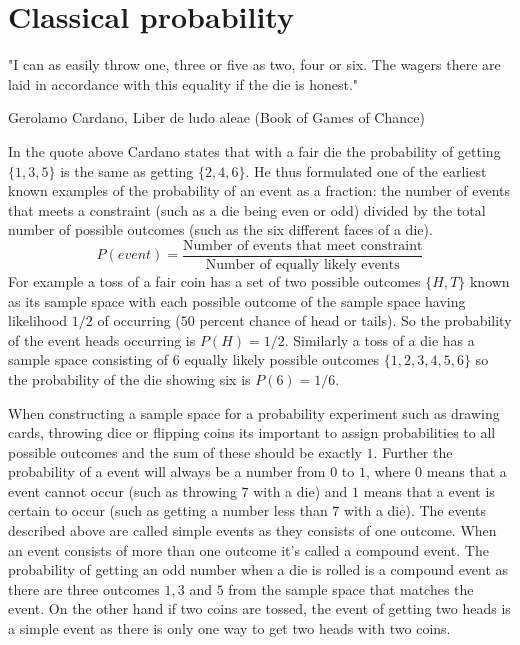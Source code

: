 \section{Classical probability}
\epigraph{"I can as easily throw one, three or five as two, four or six. The wagers there are laid in accordance with this equality if the die is honest."}{\textup{Gerolamo Cardano}, Liber de ludo aleae (Book of Games of Chance)}

In the quote above Cardano states that with a fair die the probability of getting $\{1,3,5\}$ is the same as getting $\{2,4,6\}$. He thus formulated one of the earliest known examples of the probability of an event as a fraction: the number of events that meets a constraint (such as a die being even or odd) divided by the total number of possible outcomes (such as the six different faces of a die).
\begin{equation}\label{prob:formula}
P(event) = \frac{\text{Number of events that meet constraint}}{\text{Number of equally likely events}}
\end{equation}
For example a toss of a fair coin has a set of two possible outcomes $\{H,T\}$ known as its sample space with each possible outcome of the sample space having likelihood $1/2$ of occurring ($50$ percent chance of head or tails). So the probability of the event heads occurring is $P(H) = 1/2$. Similarly a toss of a die has a sample space consisting of $6$ equally likely possible outcomes $\{1, 2, 3, 4, 5, 6\}$ so the probability of the die showing six is $P(6) = 1/6$.

When constructing a sample space for a probability experiment such as drawing cards, throwing dice or flipping coins its important to assign probabilities to all possible outcomes and the sum of these should be exactly $1$. Further the probability of a event will always be a number from $0$ to $1$, where $0$ means that a event cannot occur (such as throwing $7$ with a die) and $1$ means that a event is certain to occur (such as getting a number less than $7$ with a die). The events described above are called simple events as they consists of one outcome. When an event consists of more than one outcome it's called a compound event. The probability of getting an odd number when a die is rolled is a compound event as there are three outcomes $1, 3$ and $5$ from the sample space that matches the event. On the other hand if two coins are tossed, the event of getting two heads is a simple event as there is only one way to get two heads with two coins.

